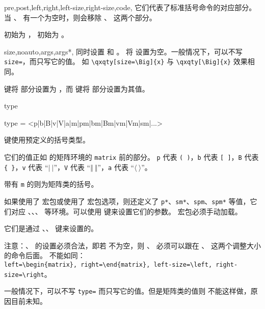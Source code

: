\documentclass{ctxdoc}
\def\emph#1{\textcolor{red!80!black}{#1}}
\begin{document}
\begin{function}{
    pre,post,left,right,left-size,right-size,code,
}
    它们代表了标准括号命令的对应部分。当 、 
    有一个为空时，则会移除 、 这两个部分。

     初始为 ， 初始为 。
\end{function}

\begin{function}{
    size,noauto,args,args*,
}
     同时设置  和 。
    将  设置为空。一般情况下，可以不写 \verb|size=|，而只写它的值。
    如 \verb|\qxqty[size=\Big]{x}| 与 \verb|\qxqty[\Big]{x}| 效果相同。

     键将  部分设置为 ，而  键将
     部分设置为其值。
\end{function}

\begin{function}{type}
    \begin{syntax}
        type = <p|b|B|v|V|a|m|pm|bm|Bm|vm|Vm|sm|...> 
    \end{syntax}
     键使用预定义的括号类型。

    它们的值正如  的矩阵环境的 \verb|matrix| 前的部分。
    \verb|p| 代表 \verb|( )|，\verb|b| 代表 \verb|[ ]|，\verb|B| 代表 
    \verb|{ }|，\verb|v| 代表 “$\vert\ \vert$”，\verb|V| 
    代表 “$\Vert\ \Vert$”，\verb|a| 代表 “$\langle\ \rangle$”。

    带有 \verb|m| 的则为矩阵类的括号。

    如果使用了  宏包或使用了  宏包选项，则还定义了 \verb|p*|、\verb|sm*|、\verb|spm|、\verb|spm*| 等值，它们对应
    、、、 等环境。可以使用  键来设置它们的参数。 宏包必须手动加载。

    它们是通过 、、 键来设置的。

    \emph{注意：、\opt{right} 的设置必须合法，即若 \opt{size} 不为空，则 \opt{left}、\opt{right} 必须可以跟在 \tn{left}、\tn{right} 这两个调整大小的命令后面。} 不能如同：\\
    \verb|left=\begin{matrix}, right=\end{matrix}, left-size=\left, right-size=\right|。

    一般情况下，可以不写 \verb|type=| 而只写它的值。但是矩阵类的值则
    不能这样做，原因目前未知。
\end{function}
\end{document}
